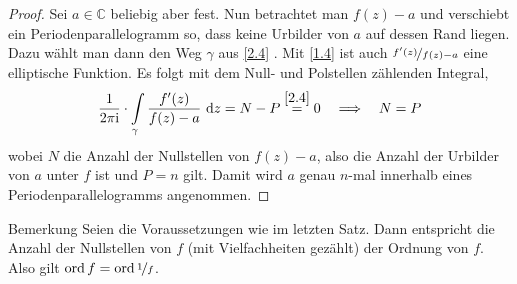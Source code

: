 \begin{proof}
Sei $a \in \mathbb{C}$ beliebig aber fest.
Nun betrachtet man $f(z) - a$ und verschiebt ein Periodenparallelogramm so, 
dass keine Urbilder von $a$ auf dessen Rand liegen.
Dazu wählt man dann den Weg $\gamma$ aus \ref{2.4} .
Mit \ref{1.4} ist auch $\nicefrac{f^\prime(z)}{f(z)-a}$ eine elliptische Funktion.
Es folgt mit dem Null- und Polstellen zählenden Integral,
\begin{align*}
\frac{1}{2 \pi \mathrm{i}} \cdot \int \limits_\gamma \frac{f^\prime(z)}{f(z)-a} \ \text{\rmfamily d} z
= N - P \overset{\ref{2.4}}{=} 0
\quad \Longrightarrow \quad N = P
\end{align*}
wobei $N$  die Anzahl der Nullstellen von $f(z) - a$, also die Anzahl der Urbilder von $a$ unter $f$ ist und $P = n$
gilt.
Damit wird $a$ genau $n$-mal innerhalb eines Periodenparallelogramms angenommen.
\end{proof}

\begin{genericdef}{Bemerkung}\label{2.6}
Seien die Voraussetzungen wie im letzten Satz.
Dann entspricht die Anzahl der Nullstellen von $f$ (mit Vielfachheiten gezählt) der Ordnung von $f$.
Also gilt $ \operatorname{ord} f = \operatorname{ord} \nicefrac{1}{f}$.
\end{genericdef}